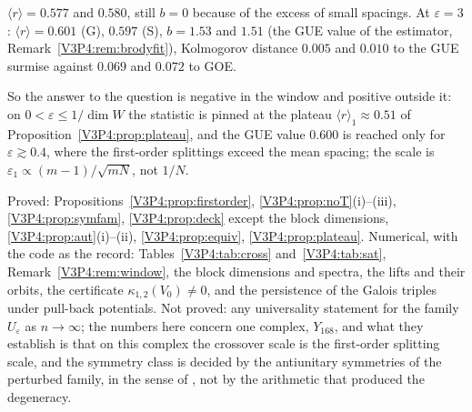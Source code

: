 \begin{remark}
\begin{enumerate}
$\langle r\rangle=0.577$ and $0.580$, still $b=0$ because of the excess of small spacings. At
$\varepsilon=3$: $\langle r\rangle=0.601$ (G), $0.597$ (S), $b=1.53$ and $1.51$ (the GUE value of
the estimator, Remark~\ref{V3P4:rem:brodyfit}), Kolmogorov distance $0.005$ and $0.010$ to the GUE
surmise against $0.069$ and $0.072$ to GOE.
\end{enumerate}
So the answer to the question is negative in the window and positive outside it: on
$0<\varepsilon\le1/\dim W$ the statistic is pinned at the plateau $\langle r\rangle_1\approx0.51$
of Proposition~\ref{V3P4:prop:plateau}, and the GUE value $0.600$ is reached only for
$\varepsilon\gtrsim0.4$, where the first-order splittings exceed the mean spacing; the scale is
$\varepsilon_1\propto(m-1)/\sqrt{mN}$, not $1/N$.
\end{remark}

\begin{remark}[Scope]\label{V3P4:rem:chaosscope}
Proved: Propositions~\ref{V3P4:prop:firstorder}, \ref{V3P4:prop:noT}(i)--(iii),
\ref{V3P4:prop:symfam}, \ref{V3P4:prop:deck} except the block dimensions,
\ref{V3P4:prop:aut}(i)--(ii), \ref{V3P4:prop:equiv}, \ref{V3P4:prop:plateau}. Numerical, with the
code as the record: Tables~\ref{V3P4:tab:cross} and~\ref{V3P4:tab:sat}, Remark~\ref{V3P4:rem:window}, the block dimensions and spectra, the lifts and
their orbits, the certificate $\kappa_{1,2}(V_0)\ne0$, and the persistence of the Galois triples
under pull-back potentials. Not proved: any universality statement for the family
$U_\varepsilon$ as $n\to\infty$; the numbers here concern one complex, $Y_{168}$, and what they
establish is that on this complex the crossover scale is the first-order splitting scale, and the
symmetry class is decided by the antiunitary symmetries of the perturbed family, in the sense of
\cite{BGS84,KS97}, not by the arithmetic that produced the degeneracy.
\end{remark}
